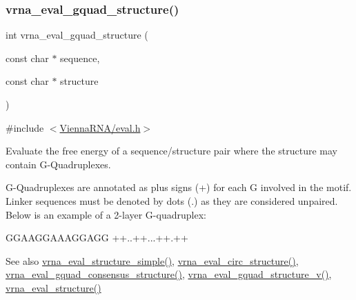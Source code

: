 \subsubsection{\texorpdfstring{vrna\+\_\+eval\+\_\+gquad\+\_\+structure()}{vrna\_eval\_gquad\_structure()}}
{\footnotesize\ttfamily int vrna\+\_\+eval\+\_\+gquad\+\_\+structure (\begin{DoxyParamCaption}\item[{const char $\ast$}]{sequence,  }\item[{const char $\ast$}]{structure }\end{DoxyParamCaption})}



{\ttfamily \#include $<$\hyperlink{eval_8h}{Vienna\+R\+N\+A/eval.\+h}$>$}



Evaluate the free energy of a sequence/structure pair where the structure may contain G-\/\+Quadruplexes. 

G-\/\+Quadruplexes are annotated as plus signs (\textquotesingle{}+\textquotesingle{}) for each G involved in the motif. Linker sequences must be denoted by dots (\textquotesingle{}.\textquotesingle{}) as they are considered unpaired. Below is an example of a 2-\/layer G-\/quadruplex\+: 
\begin{DoxyCode}
GGAAGGAAAGGAGG
++..++...++.++
\end{DoxyCode}


\begin{DoxySeeAlso}{See also}
\hyperlink{group__eval_ga7e5273464b775d4130245681312c1369}{vrna\+\_\+eval\+\_\+structure\+\_\+simple()}, \hyperlink{group__eval_ga3e05a23ddf9b083f4e69881e440d4866}{vrna\+\_\+eval\+\_\+circ\+\_\+structure()}, \hyperlink{group__eval_gaf09a326b3d57a4b30c27bd0e216198ac}{vrna\+\_\+eval\+\_\+gquad\+\_\+consensus\+\_\+structure()}, \hyperlink{group__eval_gaeaa2bdbc1b5d78c667e735fbdff87fff}{vrna\+\_\+eval\+\_\+gquad\+\_\+structure\+\_\+v()}, \hyperlink{group__eval_ga58f199f1438d794a265f3b27fc8ea631}{vrna\+\_\+eval\+\_\+structure()}
\end{DoxySeeAlso}


